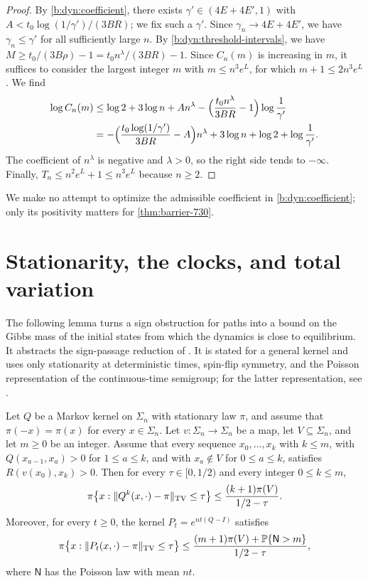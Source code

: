 \begin{proof}
By \eqref{b:dyn:coefficient}, there exists $\gamma'\in(4E+4E',1)$ with $A<t_0\log(1/\gamma')/(3BR)$; we fix such a $\gamma'$. Since $\gamma_n\to4E+4E'$, we have $\gamma_n\le\gamma'$ for all sufficiently large $n$. By \eqref{b:dyn:threshold-intervals}, we have $M\ge t_0/(3B\rho)-1=t_0n^\lambda/(3BR)-1$. Since $C_n(m)$ is increasing in $m$, it suffices to consider the largest integer $m$ with $m\le n^3e^L$, for which $m+1\le2n^3e^{L}$. We find
\[
 \begin{aligned}
 \log C_n(m)&\le\log2+3\log n+An^\lambda-\Bigl(\frac{t_0n^\lambda}{3BR}-1\Bigr)\log\frac1{\gamma'}\\
 &=-\Bigl(\frac{t_0\log(1/\gamma')}{3BR}-A\Bigr)n^\lambda+3\log n+\log2+\log\frac1{\gamma'}.
 \end{aligned}
\]
The coefficient of $n^\lambda$ is negative and $\lambda>0$, so the right side tends to $-\infty$. Finally, $T_n\le n^2e^L+1\le n^3e^L$ because $n\ge2$.
\end{proof}

We make no attempt to optimize the admissible coefficient in \eqref{b:dyn:coefficient}; only its positivity matters for \cref{thm:barrier-730}.

\section{Stationarity, the clocks, and total variation}\label{b:sec:dyn-TV}

The following lemma turns a sign obstruction for paths into a bound on the Gibbs mass of the initial states from which the dynamics is close to equilibrium. It abstracts the sign-passage reduction of \cite[Section~8.1, (8.1)--(8.3)]{oai-barriers}. It is stated for a general kernel and uses only stationarity at deterministic times, spin-flip symmetry, and the Poisson representation of the continuous-time semigroup; for the latter representation, see \cite[Section~20.1, (20.5)--(20.6)]{levin-peres-2017}.

\begin{lemma}\label{lem:bp-sign-test}
Let $Q$ be a Markov kernel on $\Sigma_n$ with stationary law $\pi$, and assume that $\pi(-x)=\pi(x)$ for every $x\in\Sigma_n$. Let $v\colon\Sigma_n\to\Sigma_n$ be a map, let $V\subseteq\Sigma_n$, and let $m\ge0$ be an integer. Assume that every sequence $x_0,\dots,x_k$ with $k\le m$, with $Q(x_{a-1},x_a)>0$ for $1\le a\le k$, and with $x_a\notin V$ for $0\le a\le k$, satisfies $R(v(x_0),x_k)>0$. Then for every $\tau\in[0,1/2)$ and every integer $0\le k\le m$,
\begin{equation}\label{eq:bp-sign-discrete}
 \pi\bigl\{x:\lVert Q^k(x,\cdot)-\pi\rVert_{\mathrm{TV}}\le\tau\bigr\}\le\frac{(k+1)\pi(V)}{1/2-\tau}.
\end{equation}
Moreover, for every $t\ge0$, the kernel $P_t=e^{nt(Q-I)}$ satisfies
\begin{equation}\label{eq:bp-sign-continuous}
 \pi\bigl\{x:\lVert P_t(x,\cdot)-\pi\rVert_{\mathrm{TV}}\le\tau\bigr\}\le\frac{(m+1)\pi(V)+\mathbb P\{\mathsf N>m\}}{1/2-\tau},
\end{equation}
where $\mathsf N$ has the Poisson law with mean $nt$.
\end{lemma}

